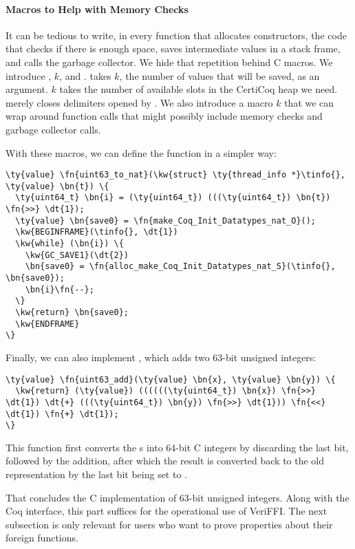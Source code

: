 \paragraph*{Macros to Help with Memory Checks}
It can be tedious to write, in every function that allocates constructors, the code that checks if there is enough space, saves intermediate values in a stack frame, and calls the garbage collector. We hide that repetition behind C macros. We introduce , $k$, and .  takes $k$, the number of values that will be saved, as an argument. $k$ takes the number of available slots in the \gls{CertiCoq heap} we need.  merely closes delimiters opened by . We also introduce a macro $k$ that we can wrap around function calls that might possibly include memory checks and garbage collector calls.

With these macros, we can define the  function in a simpler way:

\begin{Verbatim}
\ty{value} \fn{uint63_to_nat}(\kw{struct} \ty{thread_info *}\tinfo{}, \ty{value} \bn{t}) \{
  \ty{uint64_t} \bn{i} = (\ty{uint64_t}) (((\ty{uint64_t}) \bn{t}) \fn{>>} \dt{1});
  \ty{value} \bn{save0} = \fn{make_Coq_Init_Datatypes_nat_O}();
  \kw{BEGINFRAME}(\tinfo{}, \dt{1})
  \kw{while} (\bn{i}) \{
    \kw{GC_SAVE1}(\dt{2})
    \bn{save0} = \fn{alloc_make_Coq_Init_Datatypes_nat_S}(\tinfo{}, \bn{save0});
    \bn{i}\fn{--};
  \}
  \kw{return} \bn{save0};
  \kw{ENDFRAME}
\}
\end{Verbatim}

\newpage
Finally, we can also implement , which adds two 63-bit unsigned integers:

\begin{Verbatim}
\ty{value} \fn{uint63_add}(\ty{value} \bn{x}, \ty{value} \bn{y}) \{
  \kw{return} (\ty{value}) ((((((\ty{uint64_t}) \bn{x}) \fn{>>} \dt{1}) \dt{+} (((\ty{uint64_t}) \bn{y}) \fn{>>} \dt{1})) \fn{<<} \dt{1}) \fn{+} \dt{1});
\}
\end{Verbatim}

This function first converts the s into 64-bit C integers by discarding the last bit, followed by the addition, after which the result is converted back to the old representation by the last bit being set to .

That concludes the C implementation of 63-bit unsigned integers. Along with the Coq interface, this part suffices for the operational use of VeriFFI. The next subsection is only relevant for users who want to prove properties about their \gls{foreign function}s.

